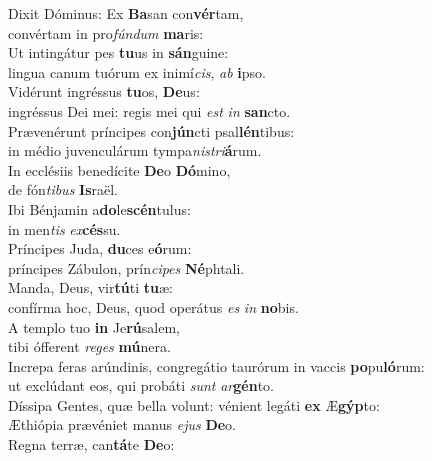 \evenverse Dixit Dóminus: Ex \textbf{Ba}san con\textbf{vér}tam,~\*\\
\evenverse convértam in pro\textit{fún}\textit{dum} \textbf{ma}ris:\\
\oddverse Ut intingátur pes \textbf{tu}us in \textbf{sán}guine:~\*\\
\oddverse lingua canum tuórum ex inimí\textit{cis}, \textit{ab} \textbf{i}pso.\\
\evenverse Vidérunt ingréssus \textbf{tu}os, \textbf{De}us:~\*\\
\evenverse ingréssus Dei mei: regis mei qui \textit{est} \textit{in} \textbf{san}cto.\\
\oddverse Prævenérunt príncipes con\textbf{jún}cti psal\textbf{lén}tibus:~\*\\
\oddverse in médio juvenculárum tympa\textit{ni}\textit{stri}\textbf{á}rum.\\
\evenverse In ecclésiis benedícite \textbf{De}o \textbf{Dó}mino,~\*\\
\evenverse de fón\textit{ti}\textit{bus} \textbf{Is}raël.\\
\oddverse Ibi Bénjamin a\textbf{do}le\textbf{scén}tulus:~\*\\
\oddverse in men\textit{tis} \textit{ex}\textbf{cés}su.\\
\evenverse Príncipes Juda, \textbf{du}ces e\textbf{ó}rum:~\*\\
\evenverse príncipes Zábulon, prín\textit{ci}\textit{pes} \textbf{Né}phtali.\\
\oddverse Manda, Deus, vir\textbf{tú}ti \textbf{tu}æ:~\*\\
\oddverse confírma hoc, Deus, quod operátus \textit{es} \textit{in} \textbf{no}bis.\\
\evenverse A templo tuo \textbf{in} Je\textbf{rú}salem,~\*\\
\evenverse tibi ófferent \textit{re}\textit{ges} \textbf{mú}nera.\\
\oddverse Increpa feras arúndinis, congregátio taurórum in vaccis \textbf{po}pu\textbf{ló}rum:~\*\\
\oddverse ut exclúdant eos, qui probáti \textit{sunt} \textit{ar}\textbf{gén}to.\\
\evenverse Díssipa Gentes, quæ bella volunt: vénient legáti \textbf{ex} Æ\textbf{gýp}to:~\*\\
\evenverse Æthiópia prævéniet manus \textit{e}\textit{jus} \textbf{De}o.\\
\oddverse Regna terræ, can\textbf{tá}te \textbf{De}o:~\*\\
